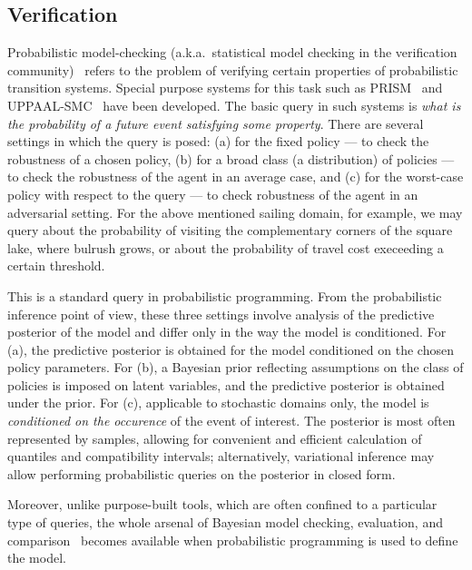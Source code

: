 \documentclass[letterpaper]{article} %
\theoremstyle{definition}
\begin{document}
\subsection{Verification}
Probabilistic model-checking (a.k.a.~statistical model checking
in the verification community)~\cite{SMC} refers to the problem of
verifying certain properties of probabilistic transition systems.
Special purpose systems for this task such as PRISM~\cite{PRISM}
and UPPAAL-SMC~\cite{UPPAAL-SMC} have been developed. %
The basic query in such systems is {\em what is the probability
of a future event satisfying some property}. 
There are several settings in which the query is posed: (a) for
the fixed policy --- to check the robustness of a chosen policy,
(b) for a broad class (a distribution) of policies --- to check
the robustness of the agent in an average case, and
(c) for the worst-case policy with respect to the query --- to
check robustness of the agent in an adversarial setting. For
the above mentioned sailing domain, for example, we may query
about the probability of visiting the complementary corners of
the square lake, where bulrush grows, or about the probability
of travel cost execeeding a certain threshold.

This is a standard query in probabilistic programming. From the
probabilistic inference point of view, these three settings
involve analysis of the predictive posterior of the model and
differ only in the way the model is conditioned. For (a), the
predictive posterior is obtained for the model conditioned on
the chosen policy parameters. For (b), a Bayesian prior
reflecting assumptions on the class of policies is imposed on
latent variables, and the predictive posterior is obtained under
the prior. For (c), applicable to stochastic domains only, the
model is \textit{conditioned on the occurence} of the event of
interest.  The posterior is most often represented by samples,
allowing for convenient and efficient calculation of quantiles
and compatibility intervals; alternatively, variational
inference may allow performing probabilistic queries on the
posterior in closed form.

Moreover, unlike  purpose-built tools, which are often confined to
a particular type of queries, the whole arsenal of Bayesian
model checking, evaluation, and comparison~\cite[Chapters
6--7]{gcs+:03} becomes available when probabilistic programming
is used to define the model.
\end{document}
